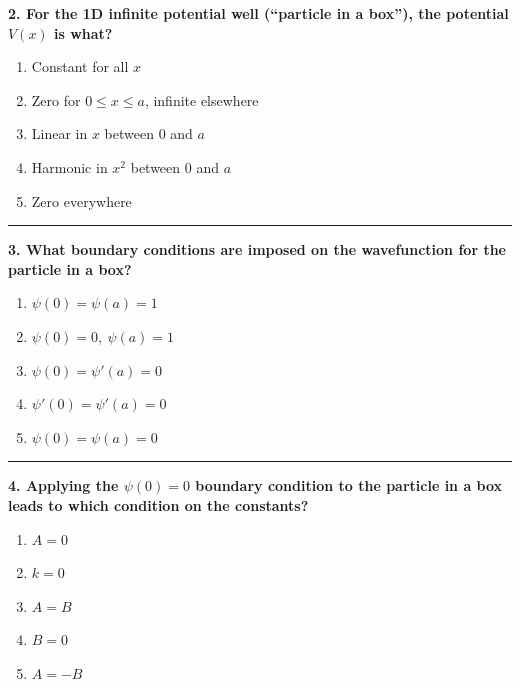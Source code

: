 \documentclass[
  english,
  9pt,
]{extbook}
\providecommand{\tightlist}{%
  \setlength{\itemsep}{0pt}\setlength{\parskip}{0pt}}
\theoremstyle{definition}
\theoremstyle{definition}
\theoremstyle{definition}
\theoremstyle{definition}
\theoremstyle{remark}
\begin{document}
\textbf{2. For the 1D infinite potential well (``particle in a box''), the potential \(V(x)\) is what?}

\begin{enumerate}
\def\labelenumi{\alph{enumi}.}
\tightlist
\item
  Constant for all \(x\)\\
\item
  Zero for \(0 \le x \le a\), infinite elsewhere\\
\item
  Linear in \(x\) between 0 and \(a\)\\
\item
  Harmonic in \(x^2\) between 0 and \(a\)\\
\item
  Zero everywhere
\end{enumerate}

\begin{center}\rule{0.5\linewidth}{0.5pt}\end{center}

\textbf{3. What boundary conditions are imposed on the wavefunction for the particle in a box?}

\begin{enumerate}
\def\labelenumi{\alph{enumi}.}
\tightlist
\item
  \(\psi(0) = \psi(a) = 1\)\\
\item
  \(\psi(0) = 0,\ \psi(a) = 1\)\\
\item
  \(\psi(0) = \psi'(a) = 0\)\\
\item
  \(\psi'(0) = \psi'(a) = 0\)\\
\item
  \(\psi(0) = \psi(a) = 0\)
\end{enumerate}

\begin{center}\rule{0.5\linewidth}{0.5pt}\end{center}

\textbf{4. Applying the \(\psi(0)=0\) boundary condition to the particle in a box leads to which condition on the constants?}

\begin{enumerate}
\def\labelenumi{\alph{enumi}.}
\tightlist
\item
  \(A = 0\)\\
\item
  \(k = 0\)\\
\item
  \(A = B\)\\
\item
  \(B = 0\)\\
\item
  \(A = -B\)
\end{enumerate}
\end{document}
